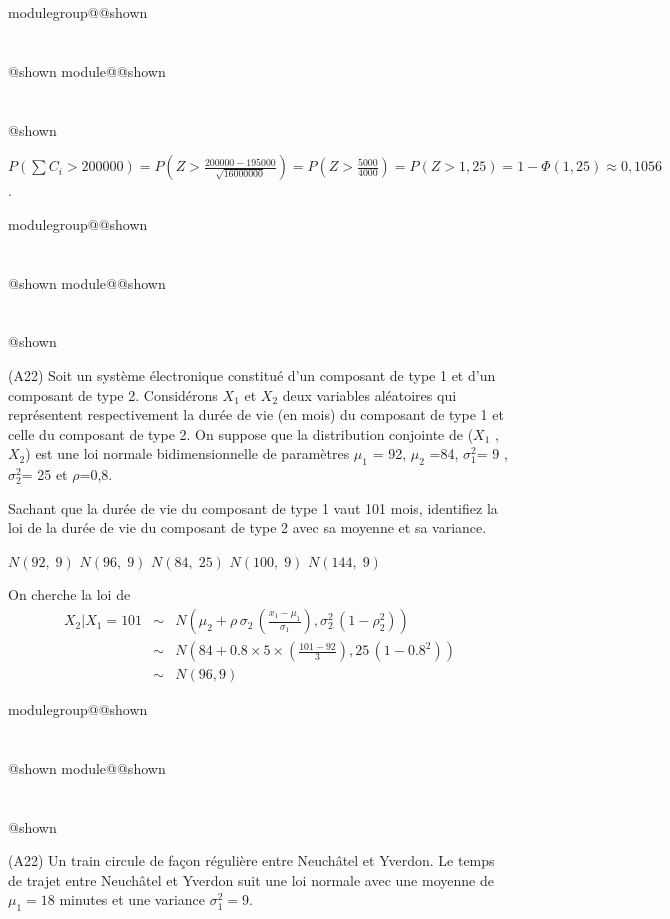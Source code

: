 \documentclass{Evaluation}
\makeatletter
\newcommand{\currentmodulekey}{}
\newcommand{\currentmoduletitle}{}
\newcommand{\currentgroupkey}{}
\newcommand{\currentgrouptitle}{}
\newcommand{\showmoduleifneeded}{%
  \ifx\currentgroupkey\empty\else
    \expandafter\ifx\csname modulegroup@\currentgroupkey @shown\endcsname\relax
      \section*{\currentgrouptitle}%
      \expandafter\gdef\csname modulegroup@\currentgroupkey @shown\endcsname{1}%
    \fi
  \fi
  \expandafter\ifx\csname module@\currentmodulekey @shown\endcsname\relax
    \section*{\currentmoduletitle}%
    \expandafter\gdef\csname module@\currentmodulekey @shown\endcsname{1}%
  \fi
}
\newenvironment{A22}{\showmoduleifneeded}{}
\newenvironment{A25}{\showmoduleifneeded}{}
\makeatother
\begin{document}
\begin{questions}
\begin{A25}
\begin{solution}
    $P\left(\sum C_i>200000\right)=P\left(Z>\frac{200000-195000}{\sqrt{16000000}}\right)=P\left(Z>\frac{5000}{4000}\right)=P(Z>1,25)=1-\Phi(1,25)\approx 0,1056$.
\end{solution}
\end{A25}


\begin{A22}
\question
(A22)
Soit un système électronique constitué d'un composant de type 1 et d'un composant de type 2. Considérons ${X}_1 $ et ${X}_2 $ deux variables aléatoires qui représentent respectivement la durée de vie (en mois) du composant de type 1 et celle du composant de type 2. On suppose que la distribution conjointe de (${X}_1 $ , ${X}_2 $) est une loi normale bidimensionnelle de paramètres ${\mu}_1 $ = 92, ${\mu}_2 $ =84, ${\sigma}_1 ^2$= 9 , ${\sigma}_2 ^2$=  25 et $\rho $=0,8.

Sachant que la durée de vie du composant de type 1 vaut 101 mois, identifiez la loi de la durée de vie du composant de type 2 avec sa moyenne et sa variance.

\begin{checkboxes}
		\choice $N(92, \; 9)$  %
		\CorrectChoice $N(96,\;9)$ %
		\choice $N(84,\; 25)$ %
		\choice $N(100, \; 9)$ %
		\choice $N(144, \; 9)$ %
	\end{checkboxes}

\begin{solution}
On cherche la loi de
		\begin{eqnarray*}
			{X}_2|{X}_1=101 &\sim& N\left(\mu_2 +\rho\, \sigma_2\, \left(\frac{x_1-\mu_1}{\sigma_1}\right),\sigma_2^2 \,\left(1-\rho_2^2\right)\right)\\
			&\sim& N\left(84 +0.8\times 5\times \left(\frac{101-92}{3}\right),25 \,\left(1-0.8^2\right)\right)\\
			&\sim& N\left(96, 9 \right)
	\end{eqnarray*}
\end{solution}

\end{A22}

\begin{A22}
\question
(A22) %
Un train circule de façon régulière entre Neuchâtel et Yverdon. Le temps de trajet entre Neuchâtel et Yverdon suit une loi normale avec une moyenne de $\mu_1=18$ minutes et une variance $\sigma_1^2=9$. 


\end{A22}
\end{questions}
\end{document}
